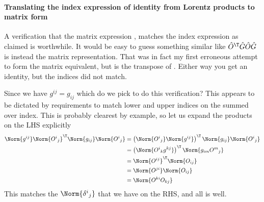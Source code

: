 \paragraph{Translating the index expression of identity from Lorentz products to matrix form}
%
A verification that the matrix expression , matches the index expression  as claimed is worthwhile.  It would be easy to guess something similar like \(\hat{O}^\T \hat{G} \hat{O} \hat{G}\) is instead the matrix representation.  That was in fact my first erroneous attempt to form the matrix equivalent, but is the transpose of .  Either way you get an identity, but the indices did not match.

Since we have \(g^{i j} = g_{i j}\) which do we pick to do this verification?  This appears to be dictated by requirements to match lower and upper indices on the summed over index.  This is probably clearest by example, so let us expand the products on the LHS explicitly
%
\begin{equation}\label{eqn:relativisticElectrodynamicsL11b:1500}
\begin{aligned}
\Norm{ g^{i j} }
\Norm{ {O^{i}}_j } ^\T
\Norm{ g_{i j} }
\Norm{ {O^{i}}_j }
&=
\left( \Norm{ {O^{i}}_j }
\Norm{ g^{i j} } \right) ^\T
\Norm{ g_{i j} }
\Norm{ {O^{i}}_j }  \\
&=
\left( \Norm{ {O^{i}}_k g^{k j} } \right) ^\T
\Norm{ g_{i m} {O^{m}}_j }  \\
&=
\Norm{ O^{i j} } ^\T
\Norm{ O_{i j} }  \\
&=
\Norm{ O^{j i} }
\Norm{ O_{i j} }  \\
&=
\Norm{ O^{k i} O_{k j} }  \\
\end{aligned}
\end{equation}
%
This matches the \(\Norm{{\delta^i}_j}\) that we have on the RHS, and all is well.
